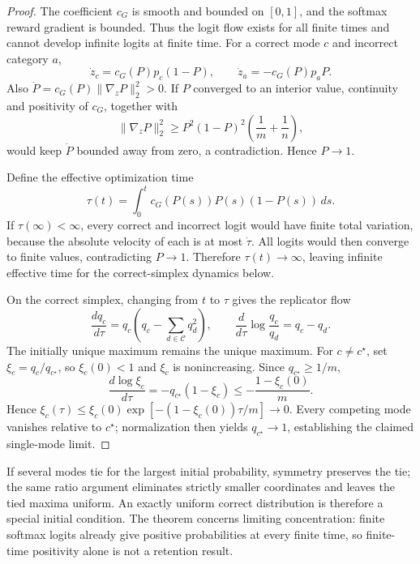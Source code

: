 \documentclass{article}
\newcommand{\1}{\mathbf 1}
\theoremstyle{remark}
\theoremstyle{definition}
\theoremstyle{plain}
\begin{document}
\begin{proof}
The coefficient $c_G$ is smooth and bounded on $[0,1]$, and the softmax
reward gradient is bounded. Thus the logit flow exists for all finite times
and cannot develop infinite logits at finite time.
For a correct mode $c$ and incorrect category $a$,
\[
  \dot z_c=c_G(P)p_c(1-P),
  \qquad
  \dot z_a=-c_G(P)p_aP.
\]
Also $\dot P=c_G(P)\lVert\nabla_zP\rVert_2^2>0$. If $P$ converged to an
interior value, continuity and positivity of $c_G$, together with
\[
 \lVert\nabla_zP\rVert_2^2
 \ge P^2(1-P)^2\left(\frac1m+\frac1n\right),
\]
would keep $\dot P$ bounded away from zero, a contradiction. Hence $P\to1$.

Define the effective optimization time
\[
  \tau(t)=\int_0^t c_G(P(s))P(s)(1-P(s))\,ds.
\]
If $\tau(\infty)<\infty$, every correct and incorrect logit would have finite
total variation, because the absolute velocity of each is at most $\dot\tau$.
All logits would then converge to finite values, contradicting $P\to1$.
Therefore $\tau(t)\to\infty$, leaving infinite effective time for the
correct-simplex dynamics below.

On the correct simplex, changing from $t$ to $\tau$ gives the replicator flow
\begin{equation}
  \frac{dq_c}{d\tau}
  =q_c\left(q_c-\sum_{d\in\mathcal C}q_d^2\right),
  \qquad
  \frac{d}{d\tau}\log\frac{q_c}{q_d}=q_c-q_d.
  \label{eq:grpo-replicator}
\end{equation}
The initially unique maximum remains the unique maximum. For $c\ne c^\star$,
set $\xi_c=q_c/q_{c^\star}$, so $\xi_c(0)<1$ and $\xi_c$ is nonincreasing.
Since $q_{c^\star}\ge1/m$,
\[
 \frac{d\log\xi_c}{d\tau}
 =-q_{c^\star}(1-\xi_c)
 \le-\frac{1-\xi_c(0)}{m}.
\]
Hence $\xi_c(\tau)\le\xi_c(0)\exp[-(1-\xi_c(0))\tau/m]\to0$.
Every competing mode vanishes relative to $c^\star$; normalization then
yields $q_{c^\star}\to1$, establishing the claimed single-mode limit.
\end{proof}

If several modes tie for the largest initial probability, symmetry preserves
the tie; the same ratio argument eliminates strictly smaller coordinates and
leaves the tied maxima uniform. An exactly uniform correct distribution is
therefore a special initial condition. The theorem concerns limiting
concentration: finite softmax logits already give positive probabilities at
every finite time, so finite-time positivity alone is not a retention result.
\end{document}
